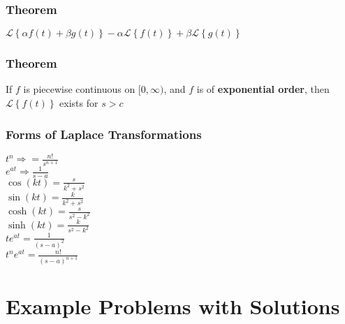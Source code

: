 \documentclass{article}
\begin{document}
\subsubsection{Theorem}
$\mathscr{L}\left\{\alpha f(t) + \beta g(t)\right\}-\alpha\mathscr{L}\left\{f(t)\right\}+\beta\mathscr{L}\left\{g(t)\right\}$
\subsubsection{Theorem}
If $f$ is piecewise continuous on $[0,\infty)$, and $f$ is of \textbf{exponential order}, then $\mathscr{L}\left\{f(t)\right\}$ exists for $s>c$
\subsubsection{Forms of Laplace Transformations}
$t^n \Rightarrow = \frac{n!}{s^{n+1}}$
\\ $e^{at} \Rightarrow \frac{1}{s-a}$
\\ $\cos(kt) = \frac{s}{k^2+s^2}$
\\ $\sin(kt) = \frac{k}{k^2+s^2}$
\\ $\cosh(kt) = \frac{s}{s^2-k^2}$
\\ $\sinh(kt) = \frac{k}{s^2-k^2}$
\\ $te^{at} = \frac{1}{(s-a)^2}$
\\ $t^ne^{at} = \frac{n!}{(s-a)^{n+1}}$













\pagebreak
\section{Example Problems with Solutions}
\end{document}
